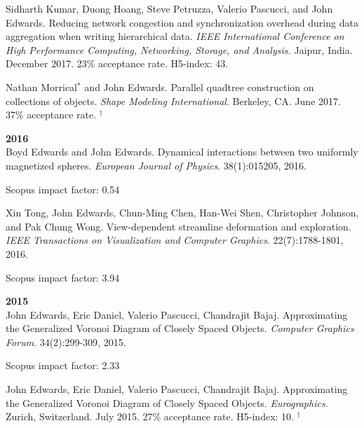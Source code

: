 \documentclass[margin,line]{res}
\newcommand{\pubunder}[1]{#1}
\begin{document}
\begin{resume}
Sidharth Kumar, Duong Hoang, Steve Petruzza, Valerio Pascucci, and \pubunder{John Edwards}. Reducing network congestion and synchronization overhead during data aggregation when writing hierarchical data. \textit{IEEE International Conference on High Performance Computing, Networking, Storage, and Analysis.} Jaipur, India. December 2017. 23\% acceptance rate. H5-index: 43.

Nathan Morrical$^*$ and \pubunder{John Edwards}. Parallel quadtree construction on collections of objects. \textit{Shape Modeling International}. Berkeley, CA. June 2017. 37\% acceptance rate.
$^\dagger$

\textbf{2016} \\
Boyd Edwards and \pubunder{John Edwards}. Dynamical interactions between two uniformly magnetized spheres. \textit{European Journal of Physics}. 38(1):015205, 2016.
\begin{IMPACT}
Scopus impact factor: 0.54 %
\end{IMPACT}

Xin Tong, \pubunder{John Edwards}, Chun-Ming Chen, Han-Wei Shen, Christopher Johnson, and Pak Chung Wong. View-dependent streamline deformation and exploration. \textit{IEEE Transactions on Visualization and Computer Graphics}. 22(7):1788-1801, 2016.
\begin{IMPACT}
Scopus impact factor: 3.94 %
\end{IMPACT}

\textbf{2015} \\
\pubunder{John Edwards}, Eric Daniel, Valerio Pascucci, Chandrajit Bajaj. Approximating the Generalized Voronoi Diagram of Closely Spaced Objects. \textit{Computer Graphics Forum}. 34(2):299-309, 2015.
\begin{IMPACT}
Scopus impact factor: 2.33 %
\end{IMPACT}

\pubunder{John Edwards}, Eric Daniel, Valerio Pascucci, Chandrajit Bajaj. Approximating the Generalized Voronoi Diagram of Closely Spaced Objects. \textit{Eurographics}. Zurich, Switzerland. July 2015. 27\% acceptance rate. H5-index: 10.
$^\dagger$


\end{resume}
\end{document}
